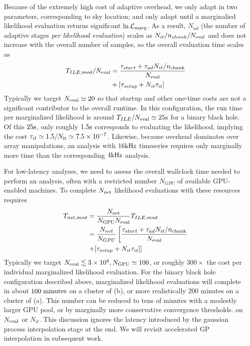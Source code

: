 \documentclass[twocolumn,prd,nofootinbib]{revtex4}
\newcommand\unit[1]{{\rm #1}}
\begin{document}
Because of the extremely high cost of adaptive overhead, we only adapt in two parameters, corresponding to sky location; 
and only adapt until a marginalied likelihood evaluation  returns significant $\ln {\cal L}_{\rm marg}$.  As a result, $N_{ad}$
(the number of adaptive stages \emph{per likelihood evaluation}) scales as $N_{it}/n_{chunk}/N_{\rm eval}$ and does not
increase with the overall number of samples, so the overall evaluation time scales as
\begin{align}
T_{ILE,mod}/N_{\rm eval} &= \frac{\tau_{start} + \tau_{ad}N_{it}/n_{\rm chunk}}{N_{\rm eval}} 
 \nonumber \\ &
 + 
 [ \tau_{setup}  + N_{it}\tau_{it}
 ] 
\end{align}
Typically we target $N_{\rm eval} \simeq 20$ so that startup and other one-time costs  are not a significant contributor to the overall
runtime.   In this configuration, the run time per marginalized likelihood is around $T_{ILE}/N_{\rm eval} \simeq 25
\unit{s}$ for a binary black hole.    Of this $25 \unit{s}$, only roughly
$1.5\unit{s}$ corresponds to evaluating the likelihood, implying the cost $\tau_{it} \simeq 1.5/N_{\rm it} \simeq
7.5\times 10^{-7}$.
Likewise, because overhead dominates over array manipulations, an analysis with  $16\unit{kHz}$ timeseries requires only
marginally more time than the corresponding $4\unit{kHz}$ analysis.


For low-latency analyses, we need to assess the overall wallclock time needed to perform an analysis, often with a
restricted number $N_{GPU}$ of available GPU-enabled machines.   To  complete $N_{\rm net}$ likelihood evaluations
with these resources requires
\begin{align}
T_{net,mod} &= \frac{N_{\rm net}}{N_{\rm GPU} N_{\rm eval}} T_{ILE,mod} \nonumber \\
& =
  \frac{N_{net}}{N_{GPU}}\left[
\frac{\tau_{start} + \tau_{ad}N_{it}/n_{\rm chunk}}{N_{\rm eval}} 
 \right. \nonumber \\
& \left. + 
 [ \tau_{setup}  + N_{it}\tau_{it}
 ] 
 \right]
\end{align}
Typically we target $N_{\rm eval}  \lesssim 3\times 10^4, N_{\rm GPU} \simeq 100$, or roughly $300\times$ the cost per
individual marginalized likelihood evaluation.  For the binary black hole configuration described above, marginalized
likelihood evaluations will complete in about $100\; \unit{minutes}$ on a cluster of (b), or more realistically 200
minutes on a cluster of (a).  This number can be reduced to
tens of minutes with a modestly larger GPU pool, or by  marginally more conservative convergence thresholds. on $N_{\rm
  eval}$ or $N_{it}$.  
This discussion ignores the latency introduced by the  gaussian process interpolation stage at the end.  We will revisit
accelerated GP interpolation in subsequent work.
\end{document}
